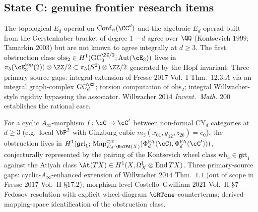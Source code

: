 \subsection{State C: genuine frontier research items}
\label{wn:subsec:wave3-stateC}

\begin{remark}
\label{wn:frontier:wave3-integral-Ed}\ClaimStatusOpen
The topological $E_d$-operad on $\mathrm{Conf}_n(\CC^d)$ and the
algebraic $E_d$-operad built from the Gerstenhaber bracket of degree
$1 - d$ agree over $\QQ$ (Kontsevich $1999$; Tamarkin $2003$) but are
not known to agree integrally at $d \geq 3$. The first obstruction
class $\mathrm{obs}_2 \in H^1(\mathrm{GC}_3^{\ZZ/2};
\mathrm{Aut}(\cE_3))$ lives in $\pi_5(\cE_3^{\mathrm{top}}(2))\otimes
\ZZ/2 \subset \pi_5(S^2)\otimes \ZZ/2$ generated by the Hopf invariant.
Three primary-source gaps: integral extension of Fresse $2017$
Vol.~I Thm.~$12.3.A$ via an integral graph-complex
$\mathrm{GC}_d^{\ZZ}$; torsion computation of $\mathrm{obs}_2$;
integral Willwacher-style rigidity bypassing the associator. Willwacher
$2014$ \emph{Invent.~Math.} $200$ establishes the rational case.
\end{remark}

\begin{remark}
\label{wn:frontier:wave3-PhiFA-nonformal}\ClaimStatusOpen
For a cyclic $A_\infty$-morphism $f\colon \cC \to \cC'$ between
non-formal CY$_d$ categories at $d \geq 3$ (e.g.\ local $\bP^2$
with Ginzburg cubic $m_3(x_{01}, y_{12}, z_{20}) = e_0$), the
obstruction lives in
$H^1(\mathfrak{grt}_1;\, \mathrm{Map}^{\mathrm{cyc}}_{E_d\text{-}
\HolFA(X)}(\Phi^{\mathrm{FA}}_d(\cC), \Phi^{\mathrm{FA}}_d(\cC')))$,
conjecturally represented by the pairing of the Kontsevich wheel class
$\mathrm{wh}_3 \in \mathfrak{grt}_1$ against the Atiyah class
$\At(TX) \in H^1(X, \Omega^1_X \otimes \mathrm{End}\,TX)$. Three
primary-source gaps: cyclic-$A_\infty$-enhanced extension of
Willwacher $2014$ Thm.~$1.1$ (out of scope in Fresse $2017$ Vol.~II
\S$17.2$); morphism-level Costello--Gwilliam $2021$ Vol.~II \S$7$
Fedosov resolution with explicit wheel-diagram $\GRTone$-counterterms;
derived-mapping-space identification of the obstruction class.
\end{remark}

